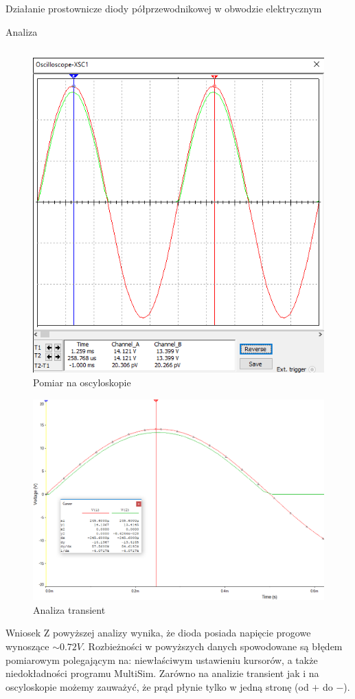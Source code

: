 \documentclass[a4paper]{scrartcl}
\begin{document}
\begin{section}{Działanie prostownicze diody półprzewodnikowej w obwodzie elektrycznym}
\begin{subsection}{Analiza}
\begin{table}[ht]
\begin{tabular}{| >{\bfseries}p{3.5cm} | l | l |}
					\end{tabular}
				\end{table}

				\begin{figure}[ht]
				\begin{center}
					\includegraphics[width=0.6\linewidth]{exercise-1-osciloscope}
					\caption{Pomiar na oscyloskopie}
					\label{fig:circuit-1-osc}
				\end{center}
				\end{figure}

				\begin{figure}[!ht]
				\begin{center}
					\includegraphics[width=0.7\linewidth,scale=2]{exercise-1-transient}
					\caption{Analiza transient}
					\label{fig:circuit-1-transient}
				\end{center}
				\end{figure}
		\end{subsection}
		\begin{subsection}{Wniosek}
			Z powyższej analizy wynika, że dioda posiada napięcie progowe wynoszące $\sim0.72 V $. Rozbieżności w powyższych danych spowodowane są błędem pomiarowym polegającym na: niewłaściwym ustawieniu kursorów, a także niedokładności programu MultiSim. Zarówno na analizie transient jak i na oscyloskopie możemy zauważyć, że prąd płynie tylko w jedną stronę (od $+$ do $-$).
		\end{subsection}
	\end{section}
\end{document}
